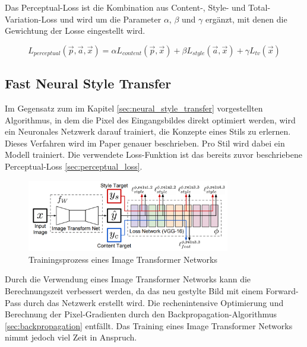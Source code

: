 Das Perceptual-Loss ist die Kombination aus Content-, Style- und Total-Variation-Loss und wird um die Parameter $ \alpha $, $ \beta $ und $ \gamma $ ergänzt, mit denen die Gewichtung der Losse eingestellt wird.

\begin{equation}
	\label{eq:perceptual_loss}
    L_{perceptual} ( \vec{p}, \vec{a}, \vec{x} ) = \alpha L_{content} ( \vec{p}, \vec{x} ) + \beta L_{style} ( \vec{a}, \vec{x} ) + \gamma L_{tv} ( \vec{x} )
\end{equation}

\subsection{Fast Neural Style Transfer}
\label{sec:fast_neural_style_transfer}

Im Gegensatz zum im Kapitel \ref{sec:neural_style_transfer} vorgestellten Algorithmus, in dem die Pixel des Eingangsbildes direkt optimiert werden, wird ein Neuronales Netzwerk darauf trainiert, die Konzepte eines Stils zu erlernen. Dieses Verfahren wird im Paper \cite{DBLP:journals/corr/JohnsonAL16} genauer beschrieben. Pro Stil wird dabei ein Modell trainiert. Die verwendete Loss-Funktion ist das bereits zuvor beschriebene Perceptual-Loss \ref{sec:perceptual_loss}.

\begin{figure}[H]
	\centering
	\includegraphics[width=0.79\textwidth]{resources/content/fast_neural_style.png}
	\caption{Trainingsprozess eines Image Transformer Networks \cite{DBLP:journals/corr/JohnsonAL16}}
	\label{img:fast_neural_style_transfer}
\end{figure}

Durch die Verwendung eines Image Transformer Networks kann die Berechnungszeit verbessert werden, da das neu gestylte Bild mit einem Forward-Pass durch das Netzwerk erstellt wird. Die rechenintensive Optimierung und Berechnung der Pixel-Gradienten durch den Backpropagation-Algorithmus \ref{sec:backpropagation} entfällt. Das Training eines Image Transformer Networks nimmt jedoch viel Zeit in Anspruch.